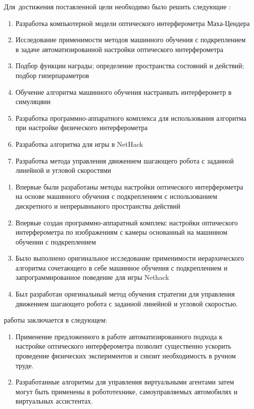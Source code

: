 Для~достижения поставленной цели необходимо было решить следующие {\tasks}:
\begin{enumerate}[beginpenalty=10000] %
  \item Разработка компьютерной модели оптического интерферометра Маха-Цендера
  \item Исследование применимости методов машинного обучения с подкреплением в задаче автоматизированной настройки оптического интерферометра
  \item Подбор функции награды; определение пространства состояний и действий; подбор гиперпараметров
  \item Обучение алгоритма машинного обучения настраивать интерферометр в симуляцяии
  \item Разработка программно-аппаратного комплекса для использования алгоритма при настройке физического интерферометра
  \item Разработка алгоритма для игры в NetHack
  \item Разработка метода управления движением шагающего робота с заданной линейной и угловой скоростями
\end{enumerate}


{\novelty}
\begin{enumerate}[beginpenalty=10000] %
  \item Впервые были разработаны методы настройки оптического интерферометра на основе машинного обучения с подкреплением с использованием дискретного и непрерывныного пространства действий
  \item Впервые создан программно-аппаратный комплекс настройки оптического интерферометра по изображениям с камеры основанный на машинном обучении с подкреплением
  \item Было выполнено оригинальное исследование применимости иерархического алгоритма сочетающего в себе машинное обучения с подкреплением и запрограммированное поведение для игры Nethack
  \item Был разработан оригинальный метод обучения стратегии для управления движением шагающего робота с заданной линейной и угловой скоростью. 
\end{enumerate}

{\influence} работы заключается в следующем:
\begin{enumerate}[beginpenalty=10000] %
  \item Применение предложенного в работе автоматизированного подхода к настройке оптического интерферометра позволит существенно ускорить проведение физических экспериментов и снизит необходимость в ручном труде. 
  \item Разработанные алгоритмы для управления виртуальными агентами затем могут быть применены в робототехнике, самоуправляемых автомобилях и виртуальных ассистентах. 
\end{enumerate}


